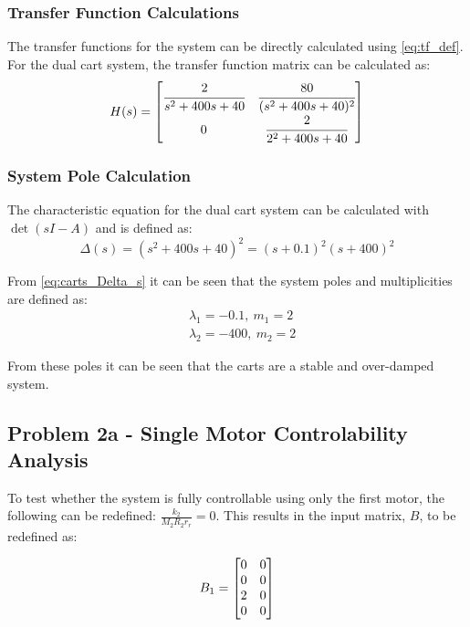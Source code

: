 \documentclass[]{article}
\begin{document}
		\subsubsection{Transfer Function Calculations}
			The transfer functions for the system can be directly calculated using \eqref{eq:tf_def}. For the dual cart system, the transfer function matrix can be calculated as:
			\begin{equation}
				H(s) = \mqty[	\cfrac{2}{s^2+400s+40}	&\cfrac{80}{(s^2+400s+40)^2}\\
								0						&\cfrac{2}{2^2+400s+40}
								]
			\end{equation}
	
		\subsubsection{System Pole Calculation}
			The characteristic equation for the dual cart system can be calculated with $\det(sI-A)$ and is defined as:
			\begin{equation}
				\Delta (s) = (s^2 + 400s +40)^2 = (s+0.1)^2(s+400)^2
				\label{eq:carts_Delta_s}
			\end{equation}
			
			From \eqref{eq:carts_Delta_s} it can be seen that the system poles and multiplicities are defined as:
			\begin{equation}
				\begin{aligned}
					&\lambda_1 = -0.1, \ m_1 = 2\\
					&\lambda_2 = -400, \ m_2 = 2
				\end{aligned}
			\end{equation}
		
			From these poles it can be seen that the carts are a stable and over-damped system.
	
	\newpage
	\subsection{Problem 2a - Single Motor Controlability Analysis}
		To test whether the system is fully controllable using only the first motor, the following can be redefined: $\frac{k_2}{M_2 R_2 r_r} = 0$. This results in the input matrix, $B$, to be redefined as:
		
		\begin{equation}
			B_1 = \mqty[0	&0\\
						0	&0\\
						2	&0\\
						0	&0]
		\end{equation}
		
\end{document}
